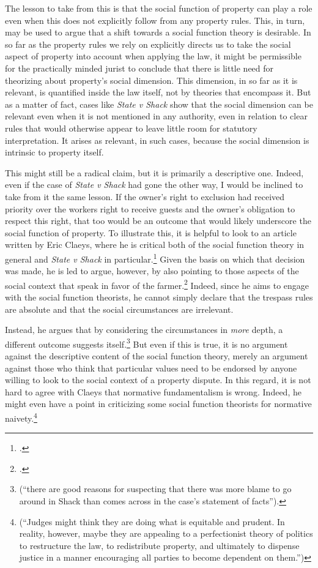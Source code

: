 The lesson to take from this is that the social function of property can play a role even when this does not explicitly follow from any property rules. This, in turn, may be used to argue that a shift towards a social function theory is desirable. In so far as the property rules we rely on explicitly directs us to take the social aspect of property into account when applying the law, it might be permissible for the practically minded jurist to conclude that there is little need for theorizing about property's social dimension. This dimension, in so far as it is relevant, is quantified inside the law itself, not by theories that encompass it. But as a matter of fact, cases like {\it State v Shack} show that the social dimension can be relevant even when it is not mentioned in any authority, even in relation to clear rules that would otherwise appear to leave little room for statutory interpretation. It arises as relevant, in such cases, because the social dimension is intrinsic to property itself. 

This might still be a radical claim, but it is primarily a descriptive one. Indeed, even if the case of {\it State v Shack} had gone the other way, I would be inclined to take from it the same lesson. If the owner's right to exclusion had received priority over the workers right to receive guests and the owner's obligation to respect this right, that too would be an outcome that would likely underscore the social function of property. To illustrate this, it is helpful to look to an article written by Eric Claeys, where he is critical both of the social function theory in general and {\it State v Shack} in particular.\footcite{claeys09} Given the basis on which that decision was made, he is led to argue, however, by also pointing to those aspects of the social context that speak in favor of the farmer.\footnote{\cite[941-942]{claeys09}.} Indeed, since he aims to engage with the social function theorists, he cannot simply declare  that the trespass rules are absolute and that the social circumstances are irrelevant. 

Instead, he argues that by considering the circumstances in {\it more} depth, a different outcome suggests itself.\footnote{\cite[941]{claeys09} (``there are good reasons for suspecting that there was more blame to go around in Shack than comes across in the case's statement of facts'').} But even if this is true, it is no argument against the descriptive content of the social function theory, merely an argument against those who think that particular values need to be endorsed by anyone willing to look to the social context of a property dispute. In this regard, it is not hard to agree with Claeys that normative fundamentalism is wrong. Indeed, he might even have a point in criticizing some social function theorists for normative naivety.\footnote{\cite[945]{claeys09} (``Judges might think they are doing what is equitable and prudent. In reality, however, maybe
they are appealing to a perfectionist theory of politics to restructure the law, to redistribute property, and ultimately to dispense justice in a manner encouraging all parties to become dependent on them.'')} 

